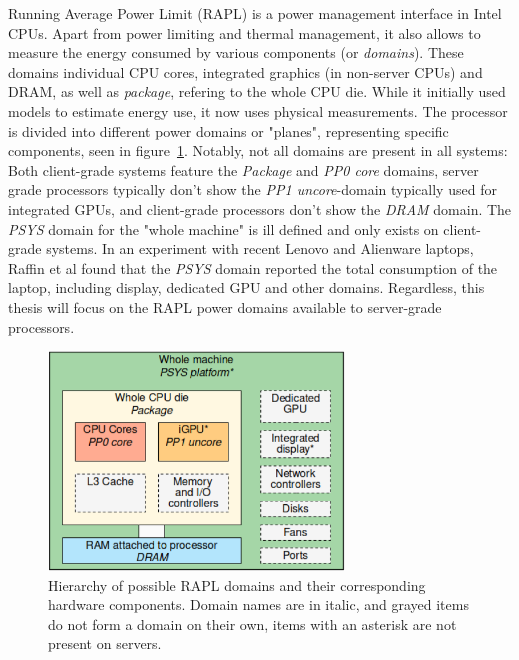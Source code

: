 Running Average Power Limit (RAPL) is a power management interface in Intel CPUs. Apart from power limiting and thermal management, it also allows to measure the energy consumed by various components (or \textit{domains}). These domains individual CPU cores, integrated graphics (in non-server CPUs) and DRAM, as well as \textit{package}, refering to the whole CPU die. While it initially used models to estimate energy use\parencite{hackenberg2015energy}, it now uses physical measurements. The processor is divided into different power domains or "planes", representing specific components, seen in figure~\ref{fig:rapl_domains}. Notably, not all domains are present in all systems: Both client-grade systems feature the \textit{Package} and \textit{PP0 core} domains, server grade processors typically don't show the \textit{PP1 uncore}-domain typically used for integrated GPUs, and client-grade processors don't show the \textit{DRAM} domain. The \textit{PSYS} domain for the "whole machine" is ill defined and only exists on client-grade systems. In an experiment with recent Lenovo and Alienware laptops, Raffin et al found that the \textit{PSYS} domain reported the total consumption of the laptop, including display, dedicated GPU and other domains. Regardless, this thesis will focus on the RAPL power domains available to server-grade processors.

\begin{figure}[ht]
    \centering
    \includegraphics[width=0.7\textwidth]{Figures/rapl_domains.png}
    \caption[Rapl domains]{Hierarchy of possible RAPL domains and their corresponding hardware components. Domain names are in italic, and grayed items do not form a domain on their own, items with an asterisk are not present on servers\parencite{raffin2024dissecting}.}
    \label{fig:rapl_domains}
\end{figure}

